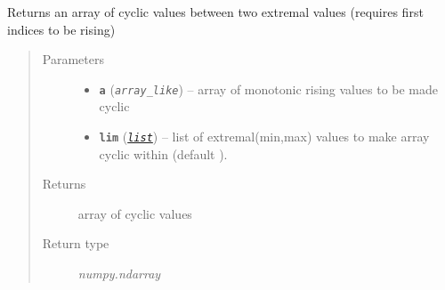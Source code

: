 \documentclass[letterpaper,10pt,english]{sphinxhowto}
\begin{document}
\begin{fulllineitems}
\label{swtools_doc:swtools.rising2cyclic}
Returns an array of cyclic values between two extremal values
(requires first indices to be rising)
\begin{quote}\begin{description}
\item[{Parameters}] \leavevmode\begin{itemize}
\item {} 
\textbf{\texttt{a}} (\emph{\texttt{array\_like}}) -- array of monotonic rising values to be made cyclic

\item {} 
\textbf{\texttt{lim}} (\href{https://docs.python.org/library/functions.html\#list}{\emph{\texttt{list}}}) -- list of extremal(min,max) values to make array cyclic within
(default \code{{[}-90,90{]}}).

\end{itemize}

\item[{Returns}] \leavevmode
array of cyclic values

\item[{Return type}] \leavevmode
\emph{numpy.ndarray}

\end{description}\end{quote}

\end{fulllineitems}

\end{document}
